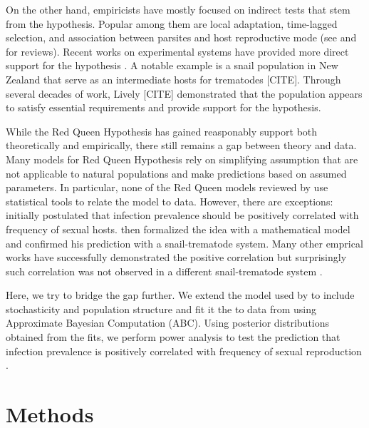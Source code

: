 \documentclass{article}\usepackage[]{graphicx}\usepackage[]{color}
\begin{document}
On the other hand, empiricists have mostly focused on indirect tests that stem from the hypothesis.
Popular among them are local adaptation, time-lagged selection, and association between parsites and host reproductive mode (see \cite{tobler2008expanding} and \cite{vergara2014infection} for reviews).
Recent works on experimental systems have provided more direct support for the hypothesis \citep{auld2016sex, slowinski2016coevolutionary}.
A notable example is a snail population in New Zealand that serve as an intermediate hosts for trematodes [CITE].
Through several decades of work, Lively [CITE] demonstrated that the population appears to satisfy essential requirements and provide support for the hypothesis.

While the Red Queen Hypothesis has gained reasponably support both theoretically and empirically, there still remains a gap between theory and data.
Many models for Red Queen Hypothesis rely on simplifying assumption that are not applicable to natural populations and make predictions based on assumed parameters.
In particular, none of the Red Queen models reviewed by \cite{ashby2015diversity} use statistical tools to relate the model to data.
However, there are exceptions:
\cite{lively1992parthenogenesis} initially postulated that infection prevalence should be positively correlated with frequency of sexual hosts. 
\citep{lively2001trematode} then formalized the idea with a mathematical model and confirmed his prediction with a snail-trematode system.
Many other emprical works have successfully demonstrated the positive correlation \citep{lively2002temporal, kumpulainen2004parasites, vergara2013geographic, mckone2016fine} but surprisingly such correlation was not observed in a different snail-trematode system \citep{dagan2013clonal}.

Here, we try to bridge the gap further.
We extend the model used by \cite{lively2010epidemiological} to include stochasticity and population structure and fit it the to data from \cite{dagan2013clonal, mckone2016fine, vergara2014infection} using Approximate Bayesian Computation (ABC).
Using posterior distributions obtained from the fits, we perform power analysis to test the prediction that infection prevalence is positively correlated with frequency of sexual reproduction \cite{lively2001trematode}.

\section{Methods}
\end{document}
